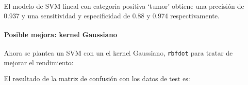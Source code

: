 \documentclass[
]{article}
\newenvironment{Shaded}{\begin{snugshade}}{\end{snugshade}}
\newcommand{\CommentTok}[1]{\textcolor[rgb]{0.56,0.35,0.01}{\textit{#1}}}
\newcommand{\DataTypeTok}[1]{\textcolor[rgb]{0.13,0.29,0.53}{#1}}
\newcommand{\KeywordTok}[1]{\textcolor[rgb]{0.13,0.29,0.53}{\textbf{#1}}}
\newcommand{\NormalTok}[1]{#1}
\newcommand{\OperatorTok}[1]{\textcolor[rgb]{0.81,0.36,0.00}{\textbf{#1}}}
\newcommand{\StringTok}[1]{\textcolor[rgb]{0.31,0.60,0.02}{#1}}
\let\oldparagraph\paragraph
\renewcommand{\paragraph}[1]{\oldparagraph{#1}\mbox{}}
\begin{document}
El modelo de SVM lineal con categoria positiva `tumor' obtiene una
precisión de 0.937 y una sensitividad y especificidad de 0.88 y 0.974
respectivamente.

\hypertarget{posible-mejora-kernel-gaussiano}{%
\paragraph{Posible mejora: kernel
Gaussiano}\label{posible-mejora-kernel-gaussiano}}

Ahora se plantea un SVM con un el kernel Gaussiano, \texttt{rbfdot} para
tratar de mejorar el rendimiento:

\begin{Shaded}
\end{Shaded}

El resultado de la matriz de confusión con los datos de test es:

\begin{Shaded}
\end{Shaded}
\end{document}
